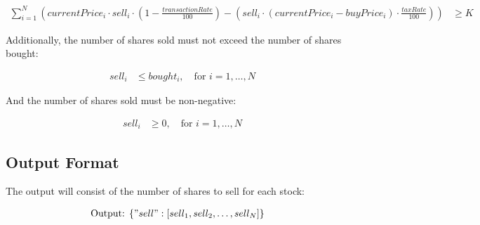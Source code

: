 \documentclass{article}
\begin{document}
\begin{align*}
\sum_{i=1}^{N} (currentPrice_i \cdot sell_i \cdot (1 - \frac{transactionRate}{100}) - (sell_i \cdot (currentPrice_i - buyPrice_i) \cdot \frac{taxRate}{100})) & \geq K
\end{align*}

Additionally, the number of shares sold must not exceed the number of shares bought:

\begin{align*}
sell_i & \leq bought_i, \quad \text{for } i = 1, \ldots, N
\end{align*}

And the number of shares sold must be non-negative:

\begin{align*}
sell_i & \geq 0, \quad \text{for } i = 1, \ldots, N
\end{align*}

\subsection*{Output Format}
The output will consist of the number of shares to sell for each stock:

\begin{align*}
\text{Output: } & \{ "sell": [sell_1, sell_2, \ldots, sell_N] \}
\end{align*}
\end{document}
